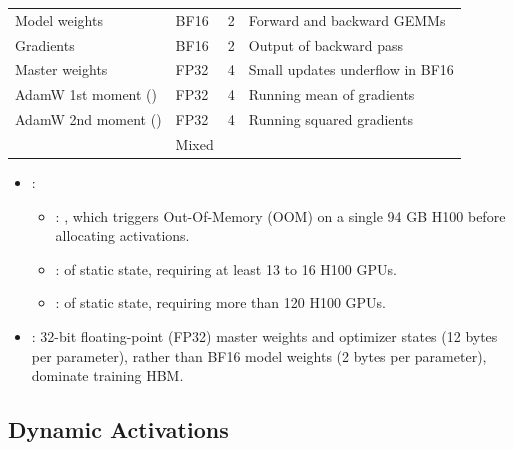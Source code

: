 \par\vspace{4pt}\noindent\begin{minipage}{\linewidth}
\small
\begin{tabularx}{\linewidth}{@{}l l c Y@{}}
\toprule
{} &  &  &  \\
\midrule
Model weights & BF16 & 2 & Forward and backward GEMMs \\
Gradients & BF16 & 2 & Output of backward pass \\
Master weights & FP32 & 4 & Small updates underflow in BF16 \\
AdamW 1st moment () & FP32 & 4 & Running mean of gradients \\
AdamW 2nd moment () & FP32 & 4 & Running squared gradients \\
\midrule
{} & Mixed &  &  \\
\bottomrule
\end{tabularx}
\end{minipage}\par\vspace{4pt}

\begin{itemize}
    \item {}:
    \begin{itemize}
        \item {}: , which triggers Out-Of-Memory (OOM) on a single 94 GB H100 before allocating activations.
        \item {}:  of static state, requiring at least 13 to 16 H100 GPUs.
        \item {}:  of static state, requiring more than 120 H100 GPUs.
    \end{itemize}
    \item {}: 32-bit floating-point (FP32) master weights and optimizer states (12 bytes per parameter), rather than BF16 model weights (2 bytes per parameter), dominate training HBM.
\end{itemize}

\subsection{Dynamic Activations}

